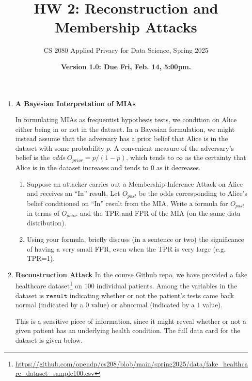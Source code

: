 \documentclass[11pt]{article}
\title{\vspace{-1.5cm} HW 2: Reconstruction and Membership Attacks}
\author{CS 2080 Applied Privacy for Data Science, Spring 2025}
\date{\textbf{Version 1.0: Due Fri, Feb. 14, 5:00pm.}}
\begin{document}
\maketitle

\instructions

\newcommand{\nval}{100}

\begin{enumerate}[leftmargin=*]

\item \textbf{A Bayesian Interpretation of MIAs}
\newcommand{\Oprior}{O_{\mathit{prior}}}
\newcommand{\Opost}{O_{\mathit{post}}}

In formulating MIAs as frequentist hypothesis tests, we condition on Alice either being in or not in the dataset.  In a Bayesian formulation, we might instead assume that the adversary has a prior belief that Alice is in the dataset with some probability $p$.  A convenient measure of the adversary's belief is the {\em odds} $\Oprior = p/(1-p)$, which tends to $\infty$ as the certainty that Alice is in the dataset increases and tends to 0 as it decreases.

\begin{enumerate}
    \item Suppose an attacker carries out a Membership Inference Attack on Alice and receives an ``In'' result.  Let $\Opost$ be the odds corresponding to Alice's belief conditioned on ``In'' result from the MIA.  Write a formula for $\Opost$ in terms of $\Oprior$ and the TPR and FPR of the MIA (on the same data distribution).

    \item Using your formula, briefly discuss (in a sentence or two) the significance of having a very small FPR, even when the TPR is very large (e.g. TPR=1).
\end{enumerate}

\item \textbf{Reconstruction Attack}  \label{prob:reconstruction}
In the course Github repo, we have provided a fake healthcare dataset\footnote{\url{https://github.com/opendp/cs208/blob/main/spring2025/data/fake_healthcare_dataset_sample100.csv}} on $100$ individual patients. 
Among the variables in the dataset is $\texttt{result}$ indicating whether or not the patient's tests came back normal (indicated by a $0$ value) or abnormal (indicated by a $1$ value).

This is a sensitive piece of information, since it might reveal whether or not a given patient has an underlying health condition. The full data card for the dataset is given below.


\end{enumerate}
\end{document}
